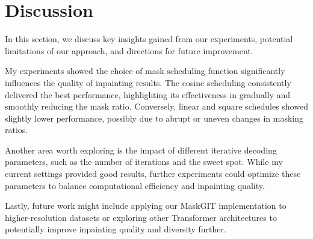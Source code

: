 \section{Discussion}
\label{sec:discussion}

In this section, we discuss key insights gained from our experiments, potential limitations of our approach, and directions for future improvement.

My experiments showed the choice of mask scheduling function significantly influences the quality of inpainting results.
The cosine scheduling consistently delivered the best performance, highlighting its effectiveness in gradually and smoothly reducing the mask ratio.
Conversely, linear and square schedules showed slightly lower performance, possibly due to abrupt or uneven changes in masking ratios.

Another area worth exploring is the impact of different iterative decoding parameters, such as the number of iterations and the sweet spot.
While my current settings provided good results, further experiments could optimize these parameters to balance computational efficiency and inpainting quality.

Lastly, future work might include applying our MaskGIT implementation to higher-resolution datasets or exploring other Transformer architectures to potentially improve inpainting quality and diversity further.
